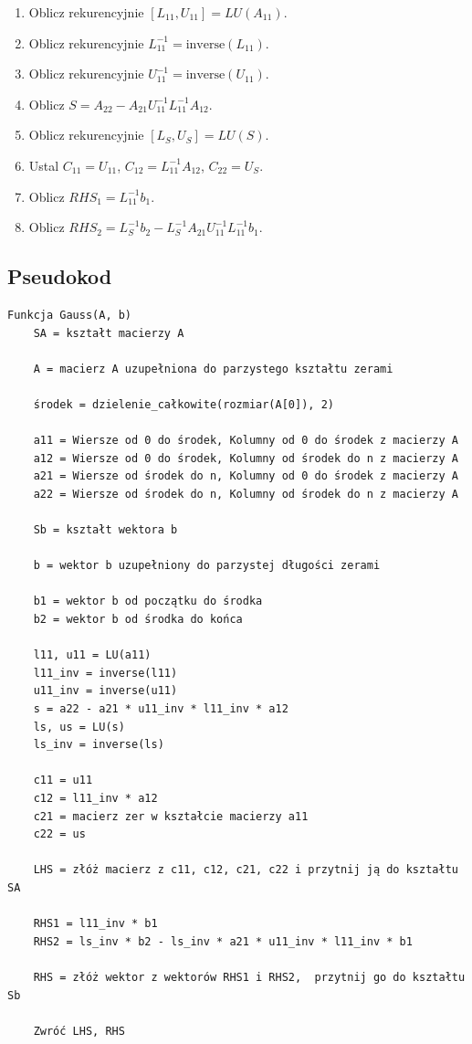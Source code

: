 \documentclass{article}
\begin{document}
\bigbreak

\begin{enumerate}
    \item Oblicz rekurencyjnie \([L_{11}, U_{11}] = LU(A_{11})\).
    \item Oblicz rekurencyjnie \(L^{-1}_{11} = \text{inverse}(L_{11})\).
    \item Oblicz rekurencyjnie \(U^{-1}_{11} = \text{inverse}(U_{11})\).
    \item Oblicz \(S = A_{22} - A_{21} U^{-1}_{11} L^{-1}_{11} A_{12}\).
    \item Oblicz rekurencyjnie \([L_S, U_S] = LU(S)\).
    \item Ustal \(C_{11} = U_{11}\), \(C_{12} = L^{-1}_{11} A_{12}\), \(C_{22} = U_S\).
    \item Oblicz \(RHS_1 = L^{-1}_{11} b_1\).
    \item Oblicz \(RHS_2 = L_S^{-1} b_2 - L_S^{-1} A_{21} U^{-1}_{11} L^{-1}_{11} b_1\).
\end{enumerate}


\subsection{Pseudokod}

\begin{verbatim}
Funkcja Gauss(A, b)
    SA = kształt macierzy A

    A = macierz A uzupełniona do parzystego kształtu zerami

    środek = dzielenie_całkowite(rozmiar(A[0]), 2) 
    
    a11 = Wiersze od 0 do środek, Kolumny od 0 do środek z macierzy A
    a12 = Wiersze od 0 do środek, Kolumny od środek do n z macierzy A
    a21 = Wiersze od środek do n, Kolumny od 0 do środek z macierzy A
    a22 = Wiersze od środek do n, Kolumny od środek do n z macierzy A

    Sb = kształt wektora b

    b = wektor b uzupełniony do parzystej długości zerami

    b1 = wektor b od początku do środka
    b2 = wektor b od środka do końca

    l11, u11 = LU(a11)
    l11_inv = inverse(l11)
    u11_inv = inverse(u11)
    s = a22 - a21 * u11_inv * l11_inv * a12
    ls, us = LU(s)
    ls_inv = inverse(ls)

    c11 = u11
    c12 = l11_inv * a12
    c21 = macierz zer w kształcie macierzy a11
    c22 = us

    LHS = złóż macierz z c11, c12, c21, c22 i przytnij ją do kształtu SA

    RHS1 = l11_inv * b1
    RHS2 = ls_inv * b2 - ls_inv * a21 * u11_inv * l11_inv * b1

    RHS = złóż wektor z wektorów RHS1 i RHS2,  przytnij go do kształtu Sb

    Zwróć LHS, RHS
\end{verbatim}
\end{document}
